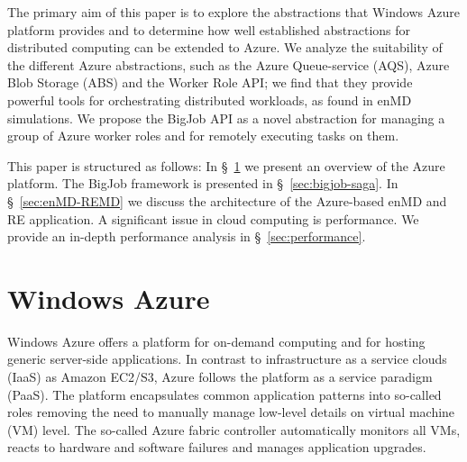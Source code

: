 \documentclass[conference,final]{IEEEtran}
\newcommand{\up}{\vspace*{-1em}}
\newcommand{\alnote}[1]{ {\textcolor{blue} { ***AL: #1 }}}
\newcommand{\jhanote}[1]{ {\textcolor{red} { ***SJ: #1 }}}
\newcommand{\alnote}[1]{}
\newcommand{\jhanote}[1]{}
\begin{document}
The primary aim of this paper is to explore the abstractions that
Windows Azure platform provides and to determine how well established
abstractions for distributed computing can be extended to Azure.  We
analyze the suitability of the different Azure abstractions, such as
the Azure Queue-service (AQS), Azure Blob Storage (ABS) and the Worker
Role API; we find that they provide powerful tools for orchestrating
distributed workloads, as found in enMD simulations.  We propose the
BigJob API as a novel abstraction for managing a group of Azure worker
roles and for remotely executing tasks on them.





This paper is structured as follows: In \S~\ref{sec:azure} we present
an overview of the Azure platform. The BigJob framework is presented
in \S~\ref{sec:bigjob-saga}. In \S~\ref{sec:enMD-REMD} we discuss the
architecture of the Azure-based enMD and RE application.  A
significant issue in cloud computing is performance. We provide an
in-depth performance analysis in \S~\ref{sec:performance}.

\up
\section{Windows Azure}
\label{sec:azure}
\up
Windows Azure offers a platform for on-demand computing and for
hosting generic server-side applications.  In contrast to
infrastructure as a service clouds (IaaS) as Amazon EC2/S3, Azure
follows the platform as a service paradigm (PaaS).  The platform
encapsulates common application patterns into so-called roles removing
the need to manually manage low-level details on virtual machine (VM)
level.  The so-called Azure fabric controller automatically monitors
all VMs, reacts to hardware and software failures and manages
application upgrades.
\end{document}
